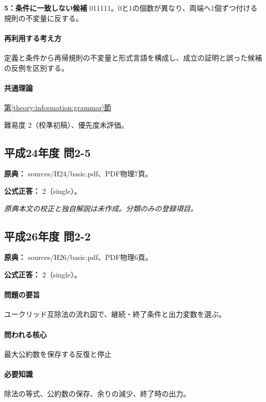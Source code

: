 \noindent\textbf{5：条件に一致しない候補} 011111。0と1の個数が異なり、両端へ1個ずつ付ける規則の不変量に反する。\par

\paragraph{再利用する考え方} 定義と条件から再帰規則の不変量と形式言語を構成し、成立の証明と誤った候補の反例を区別する。

\paragraph{共通理論} \hyperref[theory:information:grammar]{第\ref*{theory:information:grammar}節}

\par 難易度 2（校準初稿）、優先度未評価。

\subsection{平成24年度 問2-5}
\label{q:h24-reg-basic-2-5}

\noindent\textbf{原典：} sources/H24/basic.pdf、PDF物理7頁。

\textbf{公式正答：} 2（single）。

\par\textit{原典本文の校正と独自解説は未作成。分類のみの登録項目。}

\subsection{平成26年度 問2-2}
\label{q:h26-reg-basic-2-2}

\noindent\textbf{原典：} sources/H26/basic.pdf、PDF物理6頁。

\textbf{公式正答：} 2（single）。

\paragraph{問題の要旨} ユークリッド互除法の流れ図で、継続・終了条件と出力変数を選ぶ。

\paragraph{問われる核心} 最大公約数を保存する反復と停止

\paragraph{必要知識} 除法の等式、公約数の保存、余りの減少、終了時の出力。

